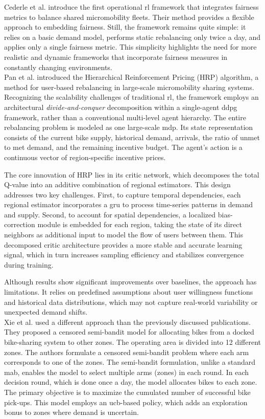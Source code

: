 Cederle et al. introduce the first operational \gls{rl} framework that integrates fairness metrics to balance shared micromobility fleets.
Their method provides a flexible approach to embedding fairness.
Still, the framework remains quite simple: it relies on a basic demand model, performs static rebalancing only twice a day, and applies only a single fairness metric.
This simplicity highlights the need for more realistic and dynamic frameworks that incorporate fairness measures in constantly changing environments.
\\

Pan et al. \cite{pan_deep_2019} introduced the Hierarchical Reinforcement Pricing (HRP) algorithm, a method for user-based rebalancing in large-scale micromobility sharing systems.
Recognizing the scalability challenges of traditional \gls{rl}, the framework employs an architectural \textit{divide-and-conquer} decomposition within a single-agent \gls{ddpg} framework, rather than a conventional multi-level agent hierarchy.
The entire rebalancing problem is modeled as one large-scale \gls{mdp}.
Its state representation consists of the current bike supply, historical demand, arrivals, the ratio of unmet to met demand, and the remaining incentive budget.
The agent's action is a continuous vector of region-specific incentive prices.

The core innovation of HRP lies in its critic network, which decomposes the total Q-value into an additive combination of regional estimators.
This design addresses two key challenges.
First, to capture temporal dependencies, each regional estimator incorporates a \gls{gru} to process time-series patterns in demand and supply.
Second, to account for spatial dependencies, a localized bias-correction module is embedded for each region, taking the state of its direct neighbors as additional input to model the flow of users between them.
This decomposed critic architecture provides a more stable and accurate learning signal, which in turn increases sampling efficiency and stabilizes convergence during training.

Although results show significant improvements over baselines, the approach has limitations.
It relies on predefined assumptions about user willingness functions and historical data distributions, which may not capture real-world variability or unexpected demand shifts.
\\

Xie et al. \cite{xie_censored_2023} used a different approach than the previously discussed publications. 
They proposed a censored semi-bandit model for allocating bikes from a docked bike-sharing system to other zones. 
The operating area is divided into 12 different zones. 
The authors formulate a censored semi-bandit problem where each arm corresponds to one of the zones. 
The semi-bandit formulation, unlike a standard \gls{mab}, enables the model to select multiple arms (zones) in each round.
In each decision round, which is done once a day, the model allocates bikes to each zone. 
The primary objective is to maximize the cumulated number of successful bike pick-ups.
This model employs an \gls{ucb}-based policy, which adds an exploration bonus to zones where demand is uncertain. 

